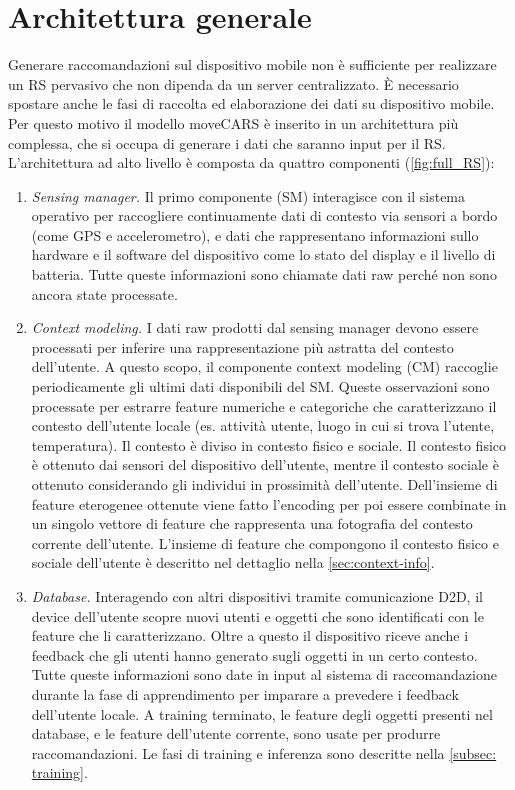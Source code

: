 \documentclass[12pt,italian]{report}
\begin{document}
\section{Architettura generale}
Generare raccomandazioni sul dispositivo mobile non è sufficiente per realizzare un RS pervasivo che non dipenda da un server centralizzato.  \`E necessario spostare anche le fasi di raccolta ed elaborazione dei dati su dispositivo mobile. Per questo motivo il modello moveCARS è inserito in un architettura più complessa, che si occupa di generare i dati che saranno input per il RS.
L'architettura ad alto livello è composta da quattro componenti (\autoref{fig:full_RS}):
\begin{enumerate}
 \item \textit{Sensing manager.} Il primo componente (SM) interagisce con il sistema operativo per raccogliere continuamente dati di contesto via sensori a bordo (come GPS e accelerometro), e dati che rappresentano informazioni sullo hardware e il software del dispositivo come lo stato del display e il livello di batteria. Tutte queste informazioni sono chiamate dati raw perché non sono ancora state processate.
 
 \item \textit{Context modeling.} I dati raw prodotti dal sensing manager devono essere processati per inferire una rappresentazione più astratta del contesto dell'utente. A questo scopo, il componente context modeling (CM) raccoglie periodicamente gli ultimi dati disponibili del SM. Queste osservazioni sono processate per estrarre feature numeriche e categoriche che caratterizzano il contesto dell'utente locale (es. attività utente, luogo in cui si trova l'utente, temperatura). Il contesto è diviso in contesto fisico e sociale. Il contesto fisico è ottenuto  dai sensori del dispositivo dell'utente, mentre il contesto sociale è ottenuto considerando gli individui in prossimità dell'utente. Dell'insieme di feature eterogenee ottenute viene fatto l'encoding per poi essere combinate in un singolo vettore di feature che rappresenta una fotografia del contesto corrente dell'utente. L'insieme di feature che compongono il contesto fisico e sociale dell'utente è descritto nel dettaglio nella \autoref{sec:context-info}.
 
 \item  \textit{Database.} Interagendo con altri dispositivi tramite comunicazione D2D, il device dell'utente scopre nuovi utenti e oggetti che sono identificati con le feature che li caratterizzano. Oltre a questo il dispositivo riceve anche i feedback che gli utenti hanno generato sugli oggetti in un certo contesto. Tutte queste informazioni sono date in input al sistema di raccomandazione durante la fase di apprendimento per imparare a prevedere i feedback dell'utente locale. A training terminato, le feature degli oggetti presenti nel database, e le feature dell'utente corrente, sono usate per produrre raccomandazioni. Le fasi di training e inferenza sono descritte nella \autoref{subsec: training}.
 

\end{enumerate}
\end{document}
